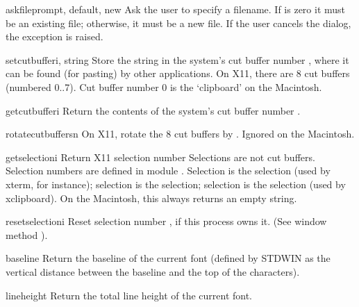 \begin{funcdesc}{askfile}{prompt, default, new}
Ask the user to specify a filename.
If
is zero it must be an existing file; otherwise, it must be a new file.
If the user cancels the dialog, the
exception is raised.
\end{funcdesc}

\begin{funcdesc}{setcutbuffer}{i, string}
Store the string in the system's cut buffer number
,
where it can be found (for pasting) by other applications.
On X11, there are 8 cut buffers (numbered 0..7).
Cut buffer number 0 is the `clipboard' on the Macintosh.
\end{funcdesc}

\begin{funcdesc}{getcutbuffer}{i}
Return the contents of the system's cut buffer number
.
\end{funcdesc}

\begin{funcdesc}{rotatecutbuffers}{n}
On X11, rotate the 8 cut buffers by
.
Ignored on the Macintosh.
\end{funcdesc}

\begin{funcdesc}{getselection}{i}
Return X11 selection number
Selections are not cut buffers.
Selection numbers are defined in module
.
Selection  is the
selection (used by
xterm,
for instance);
selection  is the
selection; selection  is the
selection (used by
xclipboard).
On the Macintosh, this always returns an empty string.
\end{funcdesc}

\begin{funcdesc}{resetselection}{i}
Reset selection number
,
if this process owns it.
(See window method
).
\end{funcdesc}

\begin{funcdesc}{baseline}{}
Return the baseline of the current font (defined by STDWIN as the
vertical distance between the baseline and the top of the
characters).
\end{funcdesc}

\begin{funcdesc}{lineheight}{}
Return the total line height of the current font.
\end{funcdesc}

